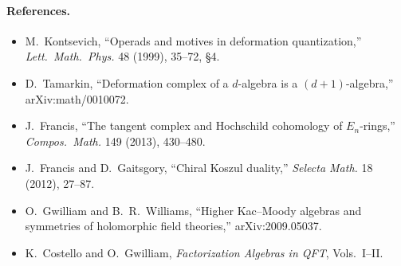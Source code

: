 \paragraph{References.}
\begin{itemize}
  \item M.\ Kontsevich, ``Operads and motives in deformation
    quantization,'' \emph{Lett.\ Math.\ Phys.} 48 (1999), 35--72, \S4.
  \item D.\ Tamarkin, ``Deformation complex of a $d$-algebra is a
    $(d{+}1)$-algebra,'' arXiv:math/0010072.
  \item J.\ Francis, ``The tangent complex and Hochschild cohomology
    of $E_n$-rings,'' \emph{Compos.\ Math.} 149 (2013), 430--480.
  \item J.\ Francis and D.\ Gaitsgory, ``Chiral Koszul duality,''
    \emph{Selecta Math.} 18 (2012), 27--87.
  \item O.\ Gwilliam and B.\ R.\ Williams, ``Higher Kac--Moody
    algebras and symmetries of holomorphic field theories,''
    arXiv:2009.05037.
  \item K.\ Costello and O.\ Gwilliam, \emph{Factorization Algebras
    in QFT}, Vols.~I--II.
\end{itemize}
